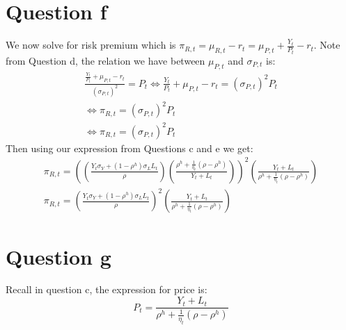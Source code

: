 \documentclass{article}
\begin{document}
\section*{Question f}
We now solve for risk premium which is $\pi_{R, t} = \mu_{R, t} - r_t = \mu_{P, t} + \frac{Y_t}{P_t} - r_t$. Note from Question d, the relation we have between $\mu_{P, t}$ and $\sigma_{P, t}$ is:
\[
    \begin{aligned}
        \frac{\frac{Y_t}{P_t} + \mu_{P, t} - r_t}{(\sigma_{P, t})^2} = P_t \iff \frac{Y_t}{P_t} + \mu_{P, t} - r_t = (\sigma_{P, t})^2 P_t\\
        \iff \pi_{R, t} = (\sigma_{P, t})^2 P_t\\
        \iff \pi_{R, t} = (\sigma_{P, t})^2 P_t
    \end{aligned}    
\]
Then using our expression from Questions c and e we get:
\[\begin{aligned}
    \pi_{R, t} = \left(\left(\frac{Y_t \sigma_Y + (1 - \rho^h) \sigma_L L_t}{\rho}\right) \left(\frac{\rho^h + \frac{1}{\eta_t}(\rho-\rho^h)}{Y_{t} + L_t} \right)\right)^2 \left(\frac{Y_{t} + L_t}{\rho^h + \frac{1}{\eta_t}(\rho-\rho^h)}\right)\\
    \boxed{\pi_{R, t} = \left(\frac{Y_t \sigma_Y + (1 - \rho^h) \sigma_L L_t}{\rho}\right)^2 \left(\frac{Y_{t} + L_t}{\rho^h + \frac{1}{\eta_t}(\rho-\rho^h)}\right)}
\end{aligned}\]
\section*{Question g}
Recall in question c, the expression for price is:
\[
    P_t = \frac{Y_{t} + L_t}{\rho^h + \frac{1}{\eta_t}(\rho-\rho^h)}    
\]
\end{document}
